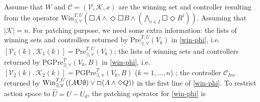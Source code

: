 Assume that $ W $ and $ \mathcal{C}=(\mathcal{V},\mathcal{K},x) $ are the winning set and controller resulting from the operator $
\text{Win}_{\exists, \forall}^{T,U}\left(\Square A \wedge \Diamond \Square B \wedge \left( \bigwedge_{i\in I} \Square \Diamond R^i\right)\right)$. Assuming that $ \vert \mathcal{K}\vert = n $. For patching purpose, we need some extra information: the lists of winning sets and controllers returned by $\text{Pre}_{\exists,\forall}^{T,U}(V_k)$ in \eqref{win-phi}, i.e. $ [\mathcal{V}_1(k),\mathcal{K}_1(k)]=\text{Pre}_{\exists,\forall}^{T,U}(V_k)$;  the lists of winning sets and controllers returned by $ \text{PGPre}_{\exists,\forall}^{T}(V_k, B) $ in \eqref{win-phi}, i.e. $ [\mathcal{V}_2(k), \mathcal{K}_2(k)]= \text{PGPre}_{\exists,\forall}^{T}(V_k, B)$ ($ k=1,..., n $) ; the controller $ \mathcal{C}_{Inv} $ returned by $ \text{\text{Win}}^{T,U}_{\exists, \forall} ((A\mathbf{U}\emptyset)\vee \Square (A\wedge \Diamond Q)) $ in the first line of \eqref{win-phi}. To restrict action space to $ \widehat{U} = U-U_d $, the patching operator for \eqref{win-phi} is

